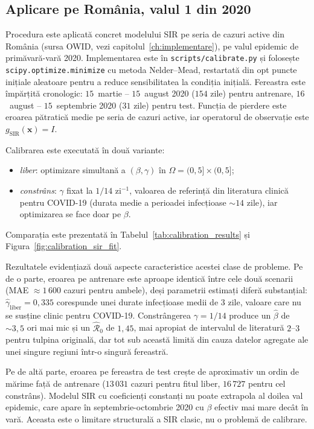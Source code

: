 \subsection{Aplicare pe România, valul 1 din 2020}
\label{subsec:calibrare_romania}

Procedura este aplicată concret modelului SIR pe seria de cazuri active din
România (sursa OWID, vezi capitolul~\ref{ch:implementare}), pe valul epidemic
de primăvară-vară 2020. Implementarea este în
\texttt{scripts/calibrate.py} și folosește
\texttt{scipy.optimize.minimize} cu metoda Nelder--Mead, restartată din opt
puncte inițiale aleatoare pentru a reduce sensibilitatea la condiția
inițială. Fereastra este împărțită cronologic: $15$~martie -- $15$~august 2020
($154$ zile) pentru antrenare, $16$~august -- $15$~septembrie 2020 ($31$ zile)
pentru test. Funcția de pierdere este eroarea pătratică medie pe seria de
cazuri active, iar operatorul de observație este $g_{\text{SIR}}(\mathbf{x})=I$.

Calibrarea este executată în două variante:
\begin{itemize}
    \item \emph{liber}: optimizare simultană a $(\beta, \gamma)$ în
    $\Omega = (0, 5] \times (0, 5]$;
    \item \emph{constrâns}: $\gamma$ fixat la $1/14$ zi$^{-1}$, valoarea de
    referință din literatura clinică pentru COVID-19 (durata medie a perioadei
    infecțioase $\sim 14$ zile), iar optimizarea se face doar pe $\beta$.
\end{itemize}
Comparația este prezentată în Tabelul~\ref{tab:calibration_results} și
Figura~\ref{fig:calibration_sir_fit}.




Rezultatele evidențiază două aspecte caracteristice acestei clase de probleme.
Pe de o parte, eroarea pe antrenare este aproape identică între cele două
scenarii (MAE $\approx 1\,600$ cazuri pentru ambele), deși parametrii estimați
diferă substanțial: $\hat\gamma_{\text{liber}} = 0{,}335$ corespunde unei
durate infecțioase medii de $3$ zile, valoare care nu se susține clinic
pentru COVID-19. Constrângerea $\gamma = 1/14$ produce un $\hat\beta$ de
$\sim 3{,}5$ ori mai mic și un $\hat{\mathcal{R}}_0$ de $1{,}45$, mai apropiat
de intervalul de literatură $2$--$3$ pentru tulpina originală, dar tot sub
această limită din cauza datelor agregate ale unei singure regiuni într-o
singură fereastră.

Pe de altă parte, eroarea pe fereastra de test crește de aproximativ un
ordin de mărime față de antrenare ($13\,031$ cazuri pentru fitul liber,
$16\,727$ pentru cel constrâns). Modelul SIR cu coeficienți constanți nu poate
extrapola al doilea val epidemic, care apare în septembrie-octombrie 2020 cu
$\beta$ efectiv mai mare decât în vară. Aceasta este o limitare structurală a
SIR clasic, nu o problemă de calibrare.

